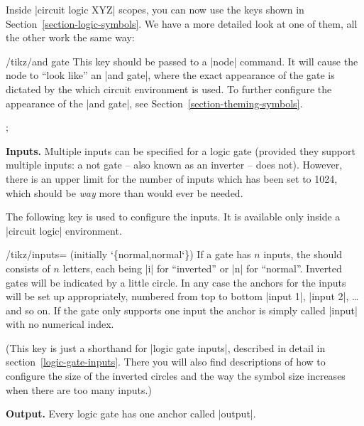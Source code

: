 Inside |circuit logic XYZ| scopes, you can now use the keys shown in
Section~\ref{section-logic-symbols}. We have a more detailed look at one of
them, all the other work the same way:

\begin{key}{/tikz/and gate}
    This key should be passed to a |node| command. It will cause the node to
    ``look like'' an |and gate|, where the exact appearance of the gate is
    dictated by the which circuit environment is used. To further configure the
    appearance of the |and gate|, see Section~\ref{section-theming-symbols}.
\begin{codeexample}[preamble={\usetikzlibrary{circuits.logic.IEC}}]
 ;
\end{codeexample}
\begin{codeexample}[preamble={\usetikzlibrary{circuits.logic.US}}]
\end{codeexample}

    \medskip\textbf{Inputs.}
    Multiple inputs can be specified for a logic gate (provided they support
    multiple inputs: a not gate -- also known as an inverter -- does not).
    However, there is an upper limit for the number of inputs which has been
    set to 1024, which should be \emph{way} more than would ever be needed.

    The following key is used to configure the inputs. It is available only
    inside a |circuit logic| environment.

    \begin{key}{/tikz/inputs= (initially \char`\{normal,normal\char`\})}
        If a gate has $n$ inputs, the  should consists of $n$
        letters, each being |i| for ``inverted'' or |n| for ``normal''.
        Inverted gates will be indicated by a little circle. In any case the
        anchors for the inputs will be set up appropriately, numbered from top
        to bottom |input 1|, |input 2|, \ldots and so on. If the gate only
        supports one input the anchor is simply called |input| with no
        numerical index.
\begin{codeexample}[preamble={\usetikzlibrary{circuits.logic.IEC}}]
\end{codeexample}
    \end{key}

    (This key is just a shorthand for |logic gate inputs|, described in detail
    in section~\ref{logic-gate-inputs}. There you will also find descriptions
    of how to configure the size of the inverted circles and the way the symbol
    size increases when there are too many inputs.)

    \textbf{Output.}
    Every logic gate has one anchor called |output|.
\end{key}


